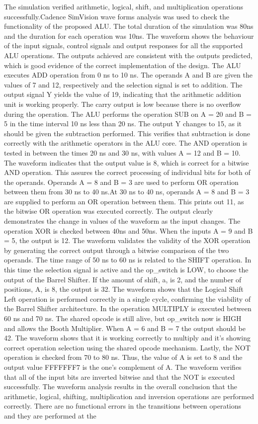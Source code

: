 \documentclass[conference]{IEEEtran}
\begin{document}
The simulation verified arithmetic, logical, shift, and multiplication operations successfully.Cadence SimVision wave forms analysis was used to check the functionality of the proposed ALU. The total duration of the simulation was 80ns and the duration for each operation was 10ns. The waveform shows the behaviour of the input signals, control signals and output responses for all the supported ALU operations. The outputs achieved are consistent with the outputs predicted, which is good evidence of the correct implementation of the design. The ALU executes ADD operation from 0 ns to 10 ns. The operands A and B are given the values of 7 and 12, respectively and the selection signal is set to addition. The output signal Y yields the value of 19, indicating that the arithmetic addition unit is working properly. The carry output is low because there is no overflow during the operation. The ALU performs the operation SUB on A = 20 and B = 5 in the time interval 10 ns less than 20 ns. The output Y changes to 15, as it should be given the subtraction performed. This verifies that subtraction is done correctly with the arithmetic operators in the ALU core. The AND operation is tested in between the times 20 ns and 30 ns, with values A = 12 and B = 10. The waveform indicates that the output value is 8, which is correct for a bitwise AND operation. This assures the correct processing of individual bits for both of the operands. Operands A = 8 and B = 3 are used to perform OR operation between them from 30 ns to 40 ns.At 30 ns to 40 ns, operands A = 8 and B = 3 are supplied to perform an OR operation between them. This prints out 11, as the bitwise OR operation was executed correctly. The output clearly demonstrates the change in values of the waveform as the input changes. The operation XOR is checked between 40ns and 50ns. When the inputs A = 9 and B = 5, the output is 12. The waveform validates the validity of the XOR operation by generating the correct output through a bitwise comparison of the two operands. The time range of 50 ns to 60 ns is related to the SHIFT operation. In this time the selection signal is active and the op\_switch is LOW, to choose the output of the Barrel Shifter. If the amount of shift, a, is 2, and the number of positions, A, is 8, the output is 32. The waveform shows that the Logical Shift Left operation is performed correctly in a single cycle, confirming the viability of the Barrel Shifter architecture. In the operation MULTIPLY is executed between 60 ns and 70 ns. The shared opcode is still alive, but op\_switch now is HIGH and allows the Booth Multiplier. When A = 6 and B = 7 the output should be 42. The waveform shows that it is working correctly to multiply and it's showing correct operation selection using the shared opcode mechanism. Lastly, the NOT operation is checked from 70 to 80 ns. Thus, the value of A is set to 8 and the output value FFFFFFF7 is the one's complement of A. The waveform verifies that all of the input bits are inverted bitwise and that the NOT is executed successfully. The waveform analysis results in the overall conclusion that the arithmetic, logical, shifting, multiplication and inversion operations are performed correctly. There are no functional errors in the transitions between operations and they are performed at the 
\end{document}
